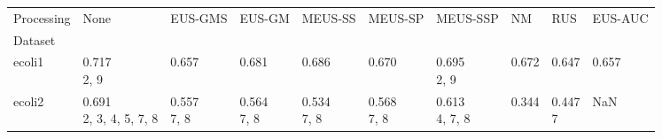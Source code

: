 \begin{tabular}{llllllllll}
\toprule
Processing &                                                     None &                                EUS-GMS &                                       EUS-GM &                                   MEUS-SS &                                   MEUS-SP &                                        MEUS-SSP &                                 NM &                                 RUS &                                EUS-AUC \\
Dataset                &                                                          &                                        &                                              &                                           &                                           &                                                 &                                    &                                     &                                        \\
\midrule
ecoli1                 &                    \makecell{0.717 \\ \scriptsize{2, 9}} &      \makecell{0.657 \\ \scriptsize{}} &            \makecell{0.681 \\ \scriptsize{}} &         \makecell{0.686 \\ \scriptsize{}} &         \makecell{0.670 \\ \scriptsize{}} &           \makecell{0.695 \\ \scriptsize{2, 9}} &  \makecell{0.672 \\ \scriptsize{}} &   \makecell{0.647 \\ \scriptsize{}} &      \makecell{0.657 \\ \scriptsize{}} \\
ecoli2                 &        \makecell{0.691 \\ \scriptsize{2, 3, 4, 5, 7, 8}} &  \makecell{0.557 \\ \scriptsize{7, 8}} &        \makecell{0.564 \\ \scriptsize{7, 8}} &     \makecell{0.534 \\ \scriptsize{7, 8}} &     \makecell{0.568 \\ \scriptsize{7, 8}} &        \makecell{0.613 \\ \scriptsize{4, 7, 8}} &  \makecell{0.344 \\ \scriptsize{}} &  \makecell{0.447 \\ \scriptsize{7}} &                                    NaN \\

\end{tabular}
